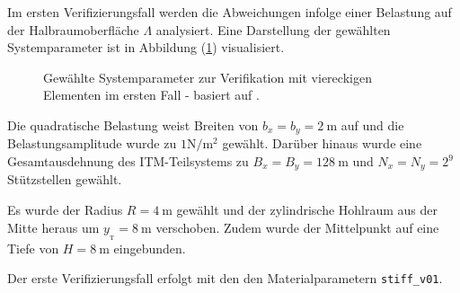 Im ersten Verifizierungsfall werden die Abweichungen infolge einer Belastung auf der Halbraumoberfläche $\Lambda$ analysiert. Eine Darstellung der gewählten Systemparameter ist in Abbildung (\ref{fig:Refsystem_v1_hs_cyl}) visualisiert.
\begin{figure}[H]
	\hspace*{35mm}
	
	\caption{Gewählte Systemparameter zur Verifikation mit viereckigen Elementen im ersten Fall - basiert auf \cite{Freisinger2022}.}
	\label{fig:Refsystem_v1_hs_cyl}
\end{figure}
Die quadratische Belastung weist Breiten von $b_x = b_y = 2\ \mathrm{m}$ auf und die Belastungsamplitude wurde zu $1 \mathrm{N}/\mathrm{m}^{2}$ gewählt.
Darüber hinaus wurde eine Gesamtausdehnung des ITM-Teilsystems zu $B_x = B_y = 128\ \mathrm{m}$ und $N_x = N_y = 2^{9}$ Stützstellen gewählt.

Es wurde der Radius $R = 4\ \mathrm{m}$ gewählt und der zylindrische Hohlraum aus der Mitte heraus um $y_{_{\mathrm{T}}} = 8\ \mathrm{m}$ verschoben. Zudem wurde der Mittelpunkt auf eine Tiefe von $H = 8\ \mathrm{m}$ eingebunden.

Der erste Verifizierungsfall erfolgt mit den den Materialparametern \texttt{stiff\_v01}.


